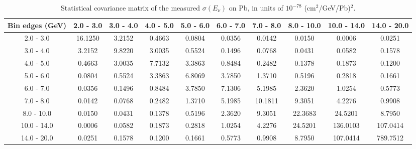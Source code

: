 \documentclass[aps,prl,twocolumn,superscriptaddress,nofootinbib]{revtex4-1}
\begin{document}
\begin{table}[h!]
  \centering
  \caption{Statistical covariance matrix of the measured $\sigma(E_{\nu})$ on Pb, in units of $10^{-78}$ (cm$^{2}$/GeV/Pb)$^{2}$.}
    \begin{tabular}{c||ccccccccc}
      Bin edges (GeV) & 2.0 - 3.0 & 3.0 - 4.0 & 4.0 - 5.0 & 5.0 - 6.0 & 6.0 - 7.0 & 7.0 - 8.0 & 8.0 - 10.0 & 10.0 - 14.0 & 14.0 - 20.0 \\
\hline \hline
        2.0 - 3.0 & 16.1250 &  3.2152 &  0.4663 &  0.0804 &  0.0356 &  0.0142 &  0.0150 &  0.0006 &  0.0251 \\
        3.0 - 4.0 &  3.2152 &  9.8220 &  3.0035 &  0.5524 &  0.1496 &  0.0768 &  0.0431 &  0.0582 &  0.1578 \\
        4.0 - 5.0 &  0.4663 &  3.0035 &  7.7132 &  3.3863 &  0.8484 &  0.2482 &  0.1378 &  0.1873 &  0.1200 \\
        5.0 - 6.0 &  0.0804 &  0.5524 &  3.3863 &  6.8069 &  3.7850 &  1.3710 &  0.5196 &  0.2818 &  0.1661 \\
        6.0 - 7.0 &  0.0356 &  0.1496 &  0.8484 &  3.7850 &  7.1306 &  5.1985 &  2.3620 &  1.0254 &  0.5773 \\
        7.0 - 8.0 &  0.0142 &  0.0768 &  0.2482 &  1.3710 &  5.1985 & 10.1811 &  9.3051 &  4.2276 &  0.9908 \\
       8.0 - 10.0 &  0.0150 &  0.0431 &  0.1378 &  0.5196 &  2.3620 &  9.3051 & 22.3683 & 24.5201 &  8.7950 \\
      10.0 - 14.0 &  0.0006 &  0.0582 &  0.1873 &  0.2818 &  1.0254 &  4.2276 & 24.5201 & 136.0103 & 107.0414 \\
      14.0 - 20.0 &  0.0251 &  0.1578 &  0.1200 &  0.1661 &  0.5773 &  0.9908 &  8.7950 & 107.0414 & 789.7512 \\
    \end{tabular}
  \label{tablecov:Pb_Statistical_Enu}
\end{table}
\end{document}
